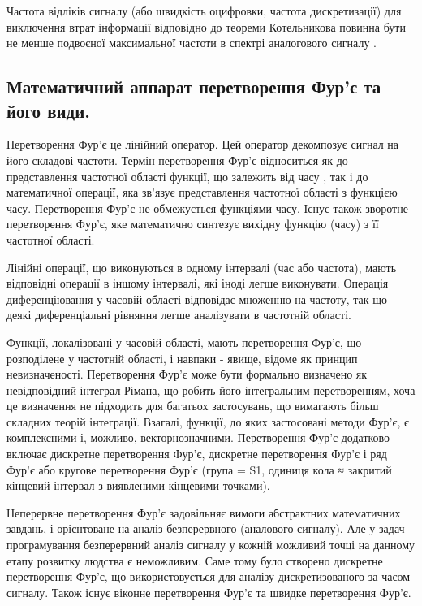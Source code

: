 Частота відліків сигналу (або швидкість оцифровки, частота дискретизації) для виключення втрат інформації відповідно до теореми Котельникова повинна бути не менше подвоєної максимальної частоти в спектрі аналогового сигналу \cite{панфилов1991теория}.

\subsection{Математичний аппарат перетворення Фур'є та його види.}

Перетворення Фур'є це лінійний оператор. Цей оператор декомпозує сигнал на його складові частоти. Термін перетворення Фур'є відноситься як до представлення частотної області функції, що залежить від часу , так і до математичної операції, яка зв'язує представлення частотної області з функцією часу. Перетворення Фур'є не обмежується функціями часу. Існує також зворотне перетворення Фур'є, яке математично синтезує вихідну функцію (часу) з її частотної області.

Лінійні операції, що виконуються в одному інтервалі (час або частота), мають відповідні операції в іншому інтервалі, які іноді легше виконувати. Операція диференціювання у часовій області відповідає множенню на частоту, так що деякі диференціальні рівняння легше аналізувати в частотній області.

Функції, локалізовані у часовій області, мають перетворення Фур'є, що розподілене у частотній області, і навпаки - явище, відоме як принцип невизначеності. Перетворення Фур'є може бути формально визначено як невідповідний інтеграл Рімана, що робить його інтегральним перетворенням, хоча це визначення не підходить для багатьох застосувань, що вимагають більш складних теорій інтеграції. Взагалі, функції, до яких застосовані методи Фур'є, є комплексними і, можливо, векторнозначними. Перетворення Фур'є додатково включає дискретне перетворення Фур'є, дискретне перетворення Фур'є і ряд Фур'є або кругове перетворення Фур'є (група = S1, одиниця кола ≈ закритий кінцевий інтервал з виявленими кінцевими точками). \cite{bailey1994fast}

Неперервне перетворення Фур'є задовільняє вимоги абстрактних математичних завдань, і орієнтоване на аналіз безперервного (аналового сигналу). Але у задач програмування безперервний аналіз сигналу у кожній можливий точці на данному етапу розвитку людства є неможливим. Саме тому було створено дискретне перетворення Фур'є, що використовується для аналізу дискретизованого за часом сигналу. Також існує віконне перетворення Фур'є та швидке перетворення Фур'є.

